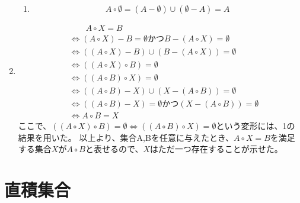 \documentclass{jsarticle}
\begin{document}
\begin{enumerate}
\begin{enumerate}
\item
\[A\circ \emptyset = (A-\emptyset)\cup(\emptyset-A)=A\]

\end{enumerate}
\item
\begin{align*}
&\qquad A\circ X=B\\
&\iff (A\circ X)-B=\emptyset かつB-(A\circ X)=\emptyset\\
&\iff ((A\circ X)-B) \cup (B-(A\circ X))=\emptyset\\
&\iff ((A\circ X)\circ B)=\emptyset\\
&\iff ((A\circ B)\circ X)=\emptyset\\
&\iff ((A\circ B)-X)\cup (X-(A\circ B))=\emptyset\\
&\iff ((A\circ B)-X)=\emptyset かつ (X-(A\circ B))=\emptyset\\
&\iff A\circ B=X
\end{align*}
ここで、$((A\circ X)\circ B)=\emptyset\iff((A\circ B)\circ X)=\emptyset$という変形には、1の結果を用いた。
以上より、集合A,Bを任意に与えたとき、$A\circ X=B$を満足する集合$X$が$A\circ B$と表せるので、$X$はただ一つ存在することが示せた。
\end{enumerate}

\section{直積集合}
\end{document}

